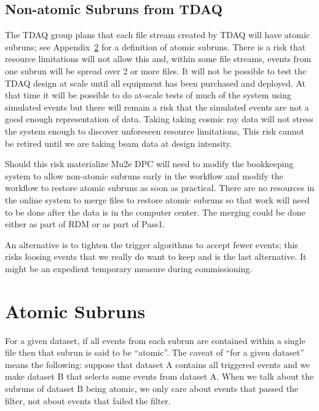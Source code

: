 \section{Non-atomic Subruns from TDAQ}
\label{sec:Risk:NonAtomicSubruns}

The TDAQ group plans that each file stream created by TDAQ will have atomic subruns;
see Appendix~\ref{ch:AtomicSubrunsExtendedDefinition} for a definition of atomic subruns.
There is a risk that resource limitations will not allow this and, within some file streams,
events from one subrun will be spread over 2 or more files.  It will not be possible
to test the TDAQ design at scale until all equipment has been purchased and deployed.
At that time it will be possible to do at-scale tests of much of the system using simulated events
but there will remain a risk that the simulated events are not a good enough representation of data.
Taking taking cosmic ray data will not stress the system enough to discover unforeseen resource limitations,
This risk cannot be retired until we are taking beam data at design intensity.

Should this risk materialize Mu2e DPC will need to modify the bookkeeping
system to allow non-atomic subruns early in the workflow and modify the workflow
to restore atomic subruns as soon as practical.
There are no resources in the online system to merge files to restore atomic subruns
so that work will need to be done after the data is in the computer center.
The merging could be done either as part of RDM or as part of Pass1.

An alternative is to tighten the trigger algorithms to accept fewer events;
this risks loosing events that we really do want to keep and is the last alternative.
It might be an expedient temporary measure during commissioning.


\appendix

\chapter{Atomic Subruns}
\label{ch:AtomicSubrunsExtendedDefinition}

For a given dataset, if all events from each subrun are contained within a single \art file
then that subrun is said to be ``atomic''.
The caveat of ``for a given dataset'' means the following:
suppose that dataset A contains all triggered events
and we make dataset B that selects some events from dataset A.
When we talk about the subruns of dataset B being atomic, we only care about events
that passed the filter, not about events that failed the filter.

